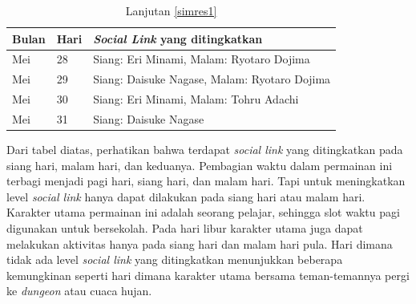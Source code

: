 \begin{table}[H]
    \caption{\label{simres2}Lanjutan \autoref{simres1}}
    \begin{center}
        \begin{tabular}{ | p{} | p{} | p{} |}
            \hline
            \textbf{Bulan} & \textbf{Hari} & \textbf{\textit{Social Link} yang ditingkatkan} \\
            \hline
            Mei            & 28            & Siang: Eri Minami, Malam: Ryotaro Dojima        \\
            \hline
            Mei            & 29            & Siang: Daisuke Nagase, Malam: Ryotaro Dojima    \\
            \hline
            Mei            & 30            & Siang: Eri Minami, Malam: Tohru Adachi          \\
            \hline
            Mei            & 31            & Siang: Daisuke Nagase                           \\
            \hline
        \end{tabular}
    \end{center}

\end{table}

Dari tabel diatas, perhatikan bahwa terdapat \textit{social link} yang ditingkatkan pada siang hari, malam hari, dan keduanya. Pembagian waktu dalam permainan ini terbagi menjadi pagi hari, siang hari, dan malam hari. Tapi untuk meningkatkan level \textit{social link} hanya dapat dilakukan pada siang hari atau malam hari. Karakter utama permainan ini adalah seorang pelajar, sehingga slot waktu pagi digunakan untuk bersekolah. Pada hari libur karakter utama juga dapat melakukan aktivitas hanya pada siang hari dan malam hari pula. Hari dimana tidak ada level \textit{social link} yang ditingkatkan menunjukkan beberapa kemungkinan seperti hari dimana karakter utama bersama teman-temannya pergi ke \textit{dungeon} atau cuaca hujan.

